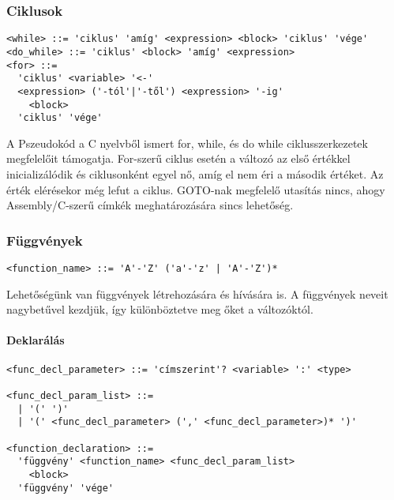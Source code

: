 \subsubsection{Ciklusok}

\begin{footnotesize}
\begin{verbatim}
<while> ::= 'ciklus' 'amíg' <expression> <block> 'ciklus' 'vége'
<do_while> ::= 'ciklus' <block> 'amíg' <expression>
<for> ::= 
  'ciklus' <variable> '<-' 
  <expression> ('-tól'|'-től') <expression> '-ig'
    <block> 
  'ciklus' 'vége'
\end{verbatim}
\end{footnotesize}

A Pszeudokód a C nyelvből ismert for, while, és do while ciklusszerkezetek megfelelőit támogatja. For-szerű ciklus esetén a változó az első értékkel inicializálódik és ciklusonként egyel nő, amíg el nem éri a második értéket. Az érték elérésekor még lefut a ciklus. GOTO-nak megfelelő utasítás nincs, ahogy Assembly/C-szerű címkék meghatározására sincs lehetőség.

\subsubsection{Függvények}

\begin{footnotesize}
\begin{verbatim}
<function_name> ::= 'A'-'Z' ('a'-'z' | 'A'-'Z')*
\end{verbatim}
\end{footnotesize}

Lehetőségünk van függvények létrehozására és hívására is. A függvények neveit nagybetűvel kezdjük, így különböztetve meg őket a változóktól.

\paragraph{Deklarálás}

\begin{footnotesize}
\begin{verbatim}
<func_decl_parameter> ::= 'címszerint'? <variable> ':' <type>

<func_decl_param_list> ::= 
  | '(' ')' 
  | '(' <func_decl_parameter> (',' <func_decl_parameter>)* ')'

<function_declaration> ::= 
  'függvény' <function_name> <func_decl_param_list> 
    <block> 
  'függvény' 'vége'
\end{verbatim}
\end{footnotesize}

